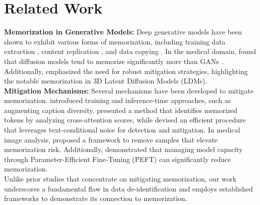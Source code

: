 \section{Related Work}
\textbf{Memorization in Generative Models: }Deep generative models have been shown to exhibit various forms of memorization, including training data extraction \cite{carlini2023extracting}, content replication \cite{somepalli2023diffusion}, and data copying \cite{somepalli2023understanding}. In the medical domain, \cite{akbar2023beware} found that diffusion models tend to memorize significantly more than GANs \cite{goodfellow}. Additionally, \cite{dar2023investigating} emphasized the need for robust mitigation strategies, highlighting the notable memorization in 3D Latent Diffusion Models (LDMs). \\\textbf{Mitigation Mechanisms: } Several mechanisms have been developed to mitigate memorization. \cite{somepalli2023understanding} introduced training and inference-time approaches, such as augmenting caption diversity. \cite{ren2024unveiling} presented a method that identifies memorized tokens by analyzing cross-attention scores, while \cite{wen2024detecting} devised an efficient procedure that leverages text-conditional noise for detection and mitigation. In medical image analysis, \cite{fernandez2023privacy} proposed a framework to remove samples that elevate memorization risk. Additionally, \cite{dutt2024memcontrol,dutt2024capacity} demonstrated that managing model capacity through Parameter-Efficient Fine-Tuning (PEFT) \cite{dutt2023parameter} can significantly reduce memorization. \\
Unlike prior studies that concentrate on mitigating memorization, our work underscores a fundamental flaw in data de-identification and employs established frameworks \cite{wen2024detecting,somepalli2023understanding} to demonstrate its connection to memorization.